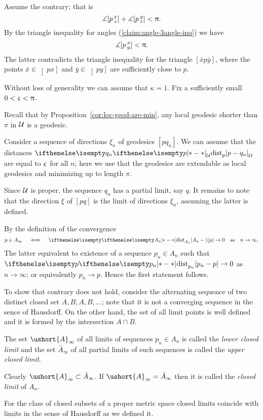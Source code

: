 Assume the contrary; that is
\[\measuredangle[p\,{}^{x}_{z}]+\measuredangle[p\,{}^{y}_{z}]< \uppi.\]
By the  triangle inequality for angles (\ref{claim:angle-3angle-inq})
we have 
\[\measuredangle[p\,{}^{x}_{y}]<\uppi.\]
The latter contradicts the triangle inequality for the triangle $[\bar x p \bar y]$,
where the points
$\bar x\in \left]px\right]$ and $\bar y\in \left]py\right]$
are sufficiently close to $p$.\qeds


Without loss of generality we can assume that $\kappa=1$.
Fix a sufficiently small $0<\upvarepsilon<\uppi$.

Recall that by Proposition~\ref{cor:loc-geod-are-min}, any local geodesic shorter than $\pi$ in  $\mathcal{U}$ is a geodesic.

Consider a sequence of directions $\xi_n$ of geodesics $[pq_n]$.
We can assume that the distances $\dist{p}{q_n}{\spc{U}}$ are equal to $\upvarepsilon$ for all $n$;
here we use that the geodesics are extendable as local geodesics and minimizing up to length $\pi$.

Since $\mathcal{U}$ is proper,
the sequence $q_n$ has a partial limit, say $q$.
It remains to note that the direction $\xi$ of $[pq]$ is the limit of directions $\xi_n$,
assuming the latter is defined.\qeds

By the definition of the convergence
\[p\in A_\infty\quad\iff\quad\dist{A_n}{}{}(p)\to 0\quad\text{as}\quad n\to \infty.\] 
The latter equivalent to existence of a sequence $p_n\in A_n$ such that
$\dist{p_n}{p}{}\to0$ as $n\to \infty$;
or equivalently $p_n\to p$.
Hence the first statement follows.

To show that contrary does not hold,
consider the alternating sequence of two distinct closed set $A,B,A,B,\dots$;
note that it is not a converging sequence in the sence of Hausdorff.
On the other hand, the set of all limit points is well defined and it is formed by the intersection $A\cap B$.\qeds

 The set $\ushort{A}_\infty$ of all limits  of sequences $p_n\in A_n$ is called the \emph{lower closed limit}
and the set $\bar{A}_\infty$ of all partial limits of such sequences is called the \emph{upper closed limit}.

Clearly $\ushort{A}_\infty\subset \bar{A}_\infty$.
If $\ushort{A}_\infty=\bar{A}_\infty$ then it is called  the \emph{closed limit} of $A_n$.

For the class of closed subsets of a proper metric space closed limits coincide with limits in the sense of Hausdorff as we defined it.

